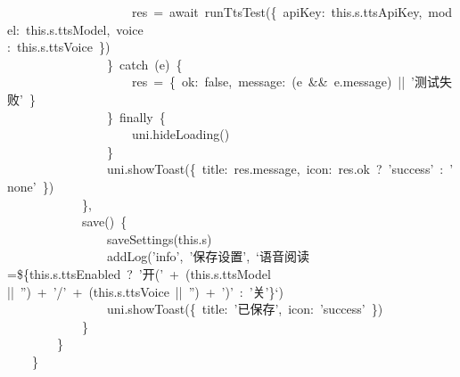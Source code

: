 \documentclass[a4paper,10pt]{article}
\begin{document}
{~~~~~~~~~~~~~~~~~~~~res~=~await~runTtsTest(\{~apiKey:~this.s.ttsApiKey,~model:~this.s.ttsModel,~voice\\
:~this.s.ttsVoice~\})\\
~~~~~~~~~~~~~~~~\}~catch~(e)~\{\\
~~~~~~~~~~~~~~~~~~~~res~=~\{~ok:~false,~message:~(e~\&\&~e.message)~||~'测试失败'~\}\\
~~~~~~~~~~~~~~~~\}~finally~\{\\
~~~~~~~~~~~~~~~~~~~~uni.hideLoading()\\
~~~~~~~~~~~~~~~~\}\\
~~~~~~~~~~~~~~~~uni.showToast(\{~title:~res.message,~icon:~res.ok~?~'success'~:~'none'~\})\\
~~~~~~~~~~~~\},\\
~~~~~~~~~~~~save()~\{\\
~~~~~~~~~~~~~~~~saveSettings(this.s)\\
~~~~~~~~~~~~~~~~addLog('info',~'保存设置',~`语音阅读=\$\{this.s.ttsEnabled~?~'开('~+~(this.s.ttsModel~\\
||~'')~+~'/'~+~(this.s.ttsVoice~||~'')~+~')'~:~'关'\}`)\\
~~~~~~~~~~~~~~~~uni.showToast(\{~title:~'已保存',~icon:~'success'~\})\\
~~~~~~~~~~~~\}\\
~~~~~~~~\}\\
~~~~\}
}

\newpage
\end{document}
